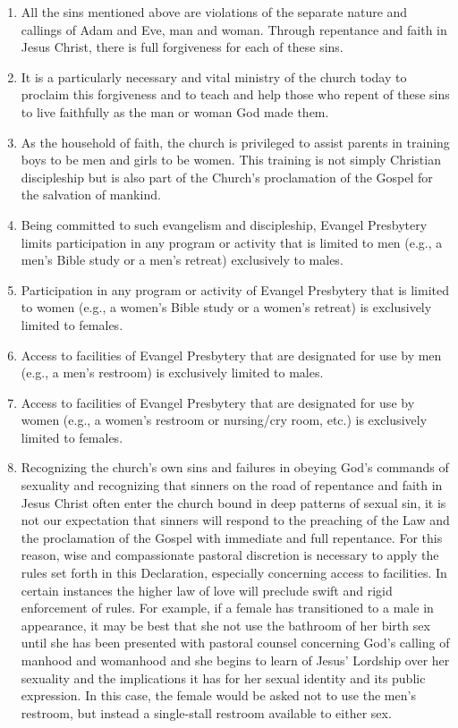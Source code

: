 \documentclass[
]{book}
\providecommand{\tightlist}{%
  \setlength{\itemsep}{0pt}\setlength{\parskip}{0pt}}
\begin{document}
\begin{enumerate}
\def\labelenumi{\arabic{enumi}.}
\setcounter{enumi}{9}
\tightlist
\item
  All the sins mentioned above are violations of the separate nature and callings of Adam and Eve, man and woman. Through repentance and faith in Jesus Christ, there is full forgiveness for each of these sins.
\item
  It is a particularly necessary and vital ministry of the church today to proclaim this forgiveness and to teach and help those who repent of these sins to live faithfully as the man or woman God made them.
\item
  As the household of faith, the church is privileged to assist parents in training boys to be men and girls to be women. This training is not simply Christian discipleship but is also part of the Church's proclamation of the Gospel for the salvation of mankind.
\item
  Being committed to such evangelism and discipleship, Evangel Presbytery limits participation in any program or activity that is limited to men (e.g., a men's Bible study or a men's retreat) exclusively to males.
\item
  Participation in any program or activity of Evangel Presbytery that is limited to women (e.g., a women's Bible study or a women's retreat) is exclusively limited to females.
\item
  Access to facilities of Evangel Presbytery that are designated for use by men (e.g., a men's restroom) is exclusively limited to males.
\item
  Access to facilities of Evangel Presbytery that are designated for use by women (e.g., a women's restroom or nursing/cry room, etc.) is exclusively limited to females.
\item
  Recognizing the church's own sins and failures in obeying God's commands of sexuality and recognizing that sinners on the road of repentance and faith in Jesus Christ often enter the church bound in deep patterns of sexual sin, it is not our expectation that sinners will respond to the preaching of the Law and the proclamation of the Gospel with immediate and full repentance. For this reason, wise and compassionate pastoral discretion is necessary to apply the rules set forth in this Declaration, especially concerning access to facilities. In certain instances the higher law of love will preclude swift and rigid enforcement of rules. For example, if a female has transitioned to a male in appearance, it may be best that she not use the bathroom of her birth sex until she has been presented with pastoral counsel concerning God's calling of manhood and womanhood and she begins to learn of Jesus' Lordship over her sexuality and the implications it has for her sexual identity and its public expression. In this case, the female would be asked not to use the men's restroom, but instead a single-stall restroom available to either sex.

\end{enumerate}
\end{document}
